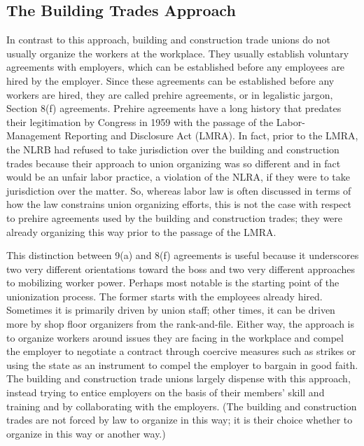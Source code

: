 \subsection{The Building Trades Approach}

In contrast to this approach, building and construction trade unions do not usually organize the workers at the workplace. They usually establish voluntary agreements with employers, which can be established before any employees are hired by the employer. Since these agreements can be established before any workers are hired, they are called prehire agreements, or in legalistic jargon, Section 8(f) agreements. Prehire agreements have a long history that predates their legitimation by Congress in 1959 with the passage of the Labor-Management Reporting and Disclosure Act (LMRA). In fact, prior to the LMRA, the NLRB had refused to take jurisdiction over the building and construction trades because their approach to union organizing was so different and in fact would be an unfair labor practice, a violation of the NLRA, if they were to take jurisdiction over the matter. So, whereas labor law is often discussed in terms of how the law constrains union organizing efforts, this is not the case with respect to prehire agreements used by the building and construction trades; they were already organizing this way prior to the passage of the LMRA.

This distinction between 9(a) and 8(f) agreements is useful because it underscores two very different orientations toward the boss and two very different approaches to mobilizing worker power. Perhaps most notable is the starting point of the unionization process. The former starts with the employees already hired. Sometimes it is primarily driven by union staff; other times, it can be driven more by shop floor organizers from the rank-and-file. Either way, the approach is to organize workers around issues they are facing in the workplace and compel the employer to negotiate a contract through coercive measures such as strikes or using the state as an instrument to compel the employer to bargain in good faith. The building and construction trade unions largely dispense with this approach, instead trying to entice employers on the basis of their members’ skill and training and by collaborating with the employers. (The building and construction trades are not forced by law to organize in this way; it is their choice whether to organize in this way or another way.)

